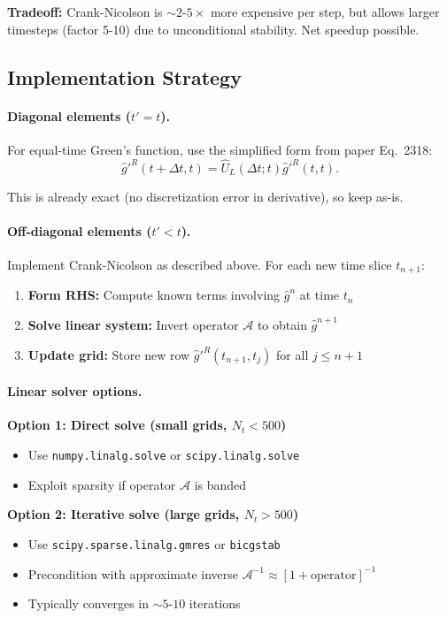 \documentclass[11pt]{article}
\begin{document}
\textbf{Tradeoff:} Crank-Nicolson is $\sim 2$-$5\times$ more expensive per step, but allows larger timesteps (factor 5-10) due to unconditional stability. Net speedup possible.

\subsection{Implementation Strategy}

\paragraph{Diagonal elements ($t' = t$).}
For equal-time Green's function, use the simplified form from paper Eq.~2318:
\begin{equation}
\hat{g}'^R(t+\Delta t, t) = \hat{U}_L(\Delta t; t) \hat{g}'^R(t,t).
\end{equation}

This is already exact (no discretization error in derivative), so keep as-is.

\paragraph{Off-diagonal elements ($t' < t$).}
Implement Crank-Nicolson as described above. For each new time slice $t_{n+1}$:

\begin{enumerate}
\item \textbf{Form RHS:} Compute known terms involving $\hat{g}^n$ at time $t_n$
\item \textbf{Solve linear system:} Invert operator $\mathcal{A}$ to obtain $\hat{g}^{n+1}$
\item \textbf{Update grid:} Store new row $\hat{g}'^R(t_{n+1}, t_j)$ for all $j \leq n+1$
\end{enumerate}

\paragraph{Linear solver options.}

\textbf{Option 1: Direct solve (small grids, $N_t < 500$)}
\begin{itemize}
\item Use \texttt{numpy.linalg.solve} or \texttt{scipy.linalg.solve}
\item Exploit sparsity if operator $\mathcal{A}$ is banded
\end{itemize}

\textbf{Option 2: Iterative solve (large grids, $N_t > 500$)}
\begin{itemize}
\item Use \texttt{scipy.sparse.linalg.gmres} or \texttt{bicgstab}
\item Precondition with approximate inverse $\mathcal{A}^{-1} \approx [1 + \text{operator}]^{-1}$
\item Typically converges in $\sim 5$-$10$ iterations
\end{itemize}
\end{document}
